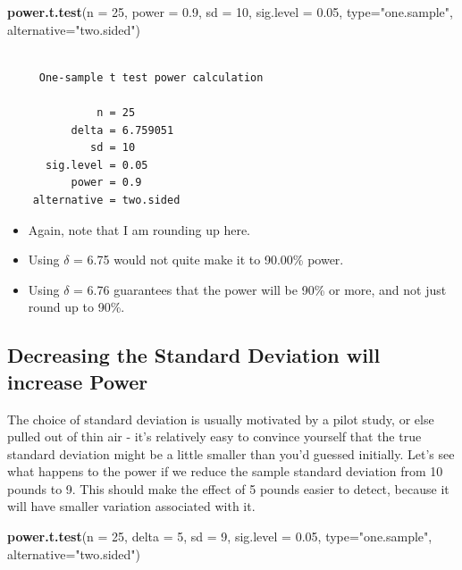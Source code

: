 \documentclass[
]{book}
\newenvironment{Shaded}{\begin{snugshade}}{\end{snugshade}}
\newcommand{\DataTypeTok}[1]{\textcolor[rgb]{0.13,0.29,0.53}{#1}}
\newcommand{\DecValTok}[1]{\textcolor[rgb]{0.00,0.00,0.81}{#1}}
\newcommand{\FloatTok}[1]{\textcolor[rgb]{0.00,0.00,0.81}{#1}}
\newcommand{\KeywordTok}[1]{\textcolor[rgb]{0.13,0.29,0.53}{\textbf{#1}}}
\newcommand{\NormalTok}[1]{#1}
\newcommand{\StringTok}[1]{\textcolor[rgb]{0.31,0.60,0.02}{#1}}
\providecommand{\tightlist}{%
  \setlength{\itemsep}{0pt}\setlength{\parskip}{0pt}}
\begin{document}
\begin{Shaded}
\begin{Highlighting}[]
\KeywordTok{power.t.test}\NormalTok{(}\DataTypeTok{n =} \DecValTok{25}\NormalTok{, }\DataTypeTok{power =} \FloatTok{0.9}\NormalTok{, }\DataTypeTok{sd =} \DecValTok{10}\NormalTok{, }\DataTypeTok{sig.level =} \FloatTok{0.05}\NormalTok{, }
             \DataTypeTok{type=}\StringTok{"one.sample"}\NormalTok{, }\DataTypeTok{alternative=}\StringTok{"two.sided"}\NormalTok{)}
\end{Highlighting}
\end{Shaded}

\begin{verbatim}

     One-sample t test power calculation 

              n = 25
          delta = 6.759051
             sd = 10
      sig.level = 0.05
          power = 0.9
    alternative = two.sided
\end{verbatim}

\begin{itemize}
\tightlist
\item
  Again, note that I am rounding up here.
\item
  Using \(\delta\) = 6.75 would not quite make it to 90.00\% power.
\item
  Using \(\delta\) = 6.76 guarantees that the power will be 90\% or more, and not just round up to 90\%.
\end{itemize}

\hypertarget{decreasing-the-standard-deviation-will-increase-power}{%
\subsection{Decreasing the Standard Deviation will increase Power}\label{decreasing-the-standard-deviation-will-increase-power}}

The choice of standard deviation is usually motivated by a pilot study, or else pulled out of thin air - it's relatively easy to convince yourself that the true standard deviation might be a little smaller than you'd guessed initially. Let's see what happens to the power if we reduce the sample standard deviation from 10 pounds to 9. This should make the effect of 5 pounds easier to detect, because it will have smaller variation associated with it.

\begin{Shaded}
\begin{Highlighting}[]
\KeywordTok{power.t.test}\NormalTok{(}\DataTypeTok{n =} \DecValTok{25}\NormalTok{, }\DataTypeTok{delta =} \DecValTok{5}\NormalTok{, }\DataTypeTok{sd =} \DecValTok{9}\NormalTok{, }\DataTypeTok{sig.level =} \FloatTok{0.05}\NormalTok{, }
             \DataTypeTok{type=}\StringTok{"one.sample"}\NormalTok{, }\DataTypeTok{alternative=}\StringTok{"two.sided"}\NormalTok{)}
\end{Highlighting}
\end{Shaded}
\end{document}
